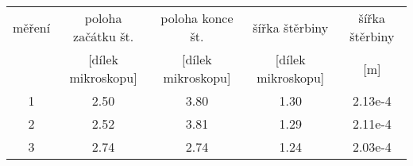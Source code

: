 \begin{tabular}[t]{
  S[table-format = 1.0]
  S[table-format = 1.2]
  S[table-format = 1.2]
  S[table-format = 1.2]
  S[table-format = 1.2e1]
} \toprule
{měření} & {poloha začátku št.} & {poloha konce št.} & {šířka štěrbiny}     & {šířka štěrbiny} \\
         & {[dílek mikroskopu]}      & {[dílek mikroskopu]}    & {[dílek mikroskopu]} & {[m]}            \\        & 2.50                      & 3.80                    & 1.30                 & 2.13e-4          \\
2        & 2.52                      & 3.81                    & 1.29                 & 2.11e-4          \\
3        & 2.74                      & 2.74                    & 1.24                 & 2.03e-4          \\
\end{tabular}
